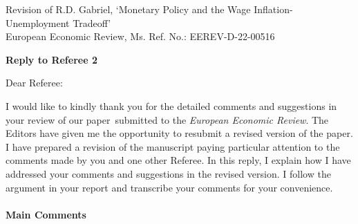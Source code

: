 \documentclass[12pt]{article}
\begin{document}
\noindent Revision of R.D. Gabriel, `Monetary Policy and the Wage Inflation-Unemployment Tradeoff' \\
\noindent European Economic Review, Ms. Ref. No.:  EEREV-D-22-00516 \bigskip

\begin{center}
\textbf{Reply to Referee 2}
\end{center}

\bigskip

\noindent Dear Referee:

\noindent I would like to kindly thank you for the detailed comments and suggestions in your review of our paper\ submitted to the \textit{European Economic Review}. The Editors have given me the opportunity to resubmit a revised version of the paper. I have prepared a revision of the manuscript paying particular attention to the comments made by you and one other Referee. In this reply, I explain how I have addressed your comments and suggestions in the revised version. I follow the argument in your report and transcribe your comments for your convenience.

\bigskip

\paragraph{Main Comments}
\end{document}
